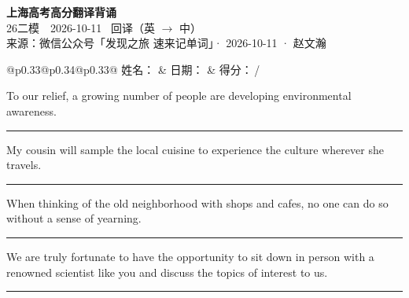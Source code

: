 \documentclass[11pt,a4paper]{article}
\newcommand{\num}[1]{\makebox[1.9em][r]{#1.}\hspace{0.3em}}
\newcommand{\wline}{\noindent\rule{\linewidth}{0.4pt}}
\begin{document}
\pagestyle{plain}
\begin{center}
{\LARGE\bfseries 上海高考高分翻译背诵 }\\[0.25em]
{\large 26二模　2026-10-11 \quad\ 回译（英 $\to$ 中）}\\[0.35em]
{\footnotesize 来源：微信公众号「发现之旅 速来记单词」· 2026-10-11 · 赵文瀚}
\end{center}

\vspace{0.4em}
\noindent\begin{tabular}{@{}p{0.33\textwidth}@{}p{0.34\textwidth}@{}p{0.33\textwidth}@{}}
姓名：\underline{\hspace{2.0cm}} & 日期：\underline{\hspace{2.0cm}} & 得分：\underline{\hspace{1.4cm}}\,/ \\
\end{tabular}

\vspace{0.5em}

\vspace{0.8em}
\num{1}To our relief, a growing number of people are developing environmental awareness.

\vspace{0.25em}

\wline

\num{2}My cousin will sample the local cuisine to experience the culture wherever she travels.

\vspace{0.25em}

\wline

\num{3}When thinking of the old neighborhood with shops and cafes, no one can do so without a sense of yearning.

\vspace{0.25em}

\wline

\num{4}We are truly fortunate to have the opportunity to sit down in person with a renowned scientist like you and discuss the topics of interest to us.

\vspace{0.25em}

\wline
\end{document}
